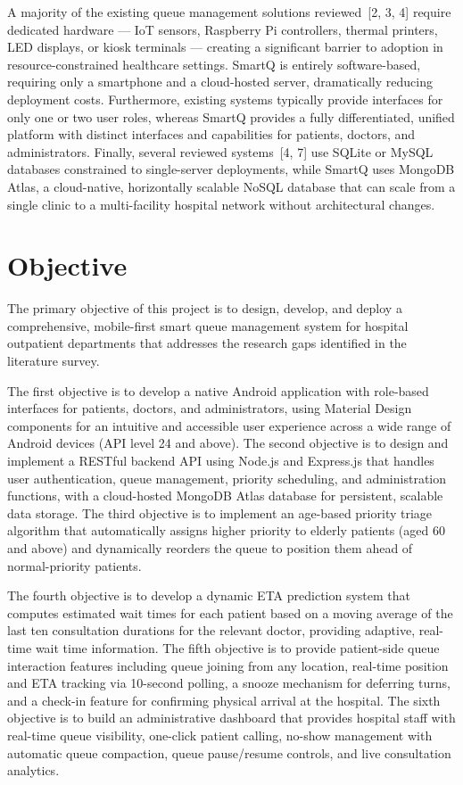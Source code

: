 \documentclass[12pt,a4paper]{article}
\begin{document}
A majority of the existing queue management solutions reviewed~[2, 3, 4] require dedicated hardware --- IoT sensors, Raspberry Pi controllers, thermal printers, LED displays, or kiosk terminals --- creating a significant barrier to adoption in resource-constrained healthcare settings. SmartQ is entirely software-based, requiring only a smartphone and a cloud-hosted server, dramatically reducing deployment costs. Furthermore, existing systems typically provide interfaces for only one or two user roles, whereas SmartQ provides a fully differentiated, unified platform with distinct interfaces and capabilities for patients, doctors, and administrators. Finally, several reviewed systems~[4, 7] use SQLite or MySQL databases constrained to single-server deployments, while SmartQ uses MongoDB Atlas, a cloud-native, horizontally scalable NoSQL database that can scale from a single clinic to a multi-facility hospital network without architectural changes.

\section{Objective}

The primary objective of this project is to design, develop, and deploy a comprehensive, mobile-first smart queue management system for hospital outpatient departments that addresses the research gaps identified in the literature survey.

The first objective is to develop a native Android application with role-based interfaces for patients, doctors, and administrators, using Material Design components for an intuitive and accessible user experience across a wide range of Android devices (API level 24 and above). The second objective is to design and implement a RESTful backend API using Node.js and Express.js that handles user authentication, queue management, priority scheduling, and administration functions, with a cloud-hosted MongoDB Atlas database for persistent, scalable data storage. The third objective is to implement an age-based priority triage algorithm that automatically assigns higher priority to elderly patients (aged 60 and above) and dynamically reorders the queue to position them ahead of normal-priority patients.

The fourth objective is to develop a dynamic ETA prediction system that computes estimated wait times for each patient based on a moving average of the last ten consultation durations for the relevant doctor, providing adaptive, real-time wait time information. The fifth objective is to provide patient-side queue interaction features including queue joining from any location, real-time position and ETA tracking via 10-second polling, a snooze mechanism for deferring turns, and a check-in feature for confirming physical arrival at the hospital. The sixth objective is to build an administrative dashboard that provides hospital staff with real-time queue visibility, one-click patient calling, no-show management with automatic queue compaction, queue pause/resume controls, and live consultation analytics.
\end{document}
